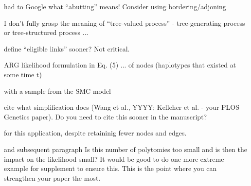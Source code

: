 
\begin{point}{\revref} %
 had to Google what ``abutting'' means! Consider using bordering/adjoning
\end{point}


\begin{point}{\revref} %
 I don't fully grasp the meaning of ``tree-valued process'' - tree-generating process or tree-structured process ...
\end{point}

\reply{
}


\begin{point}{\revref} %
 define ``eligible links'' sooner? Not critical.
\end{point}

\reply{
}

\begin{point}{\revref} %
 ARG likelihood formulation in Eq. (5) ... of nodes (haplotypes that existed at some time t)
\end{point}

\reply{
}

\begin{point}{\revref} %
 with a sample from the SMC model
\end{point}

\reply{
}

\begin{point}{\revref} %
 cite what simplification does (Wang et al., YYYY; Kelleher et al. - your PLOS Genetics paper). Do you need to cite this sooner in the manuscript?
\end{point}

\reply{
}

\begin{point}{\revref} %
 for this application, despite retaininig fewer nodes and edges.
\end{point}

\reply{
}

\begin{point}{\revref{} and subsequent paragraph} %
 Is this number of polytomies too small and is then the impact on the likelihood small? It would be good to do one more extreme example for supplement to ensure this. This is the point where you can strengthen your paper the most.
\end{point}


